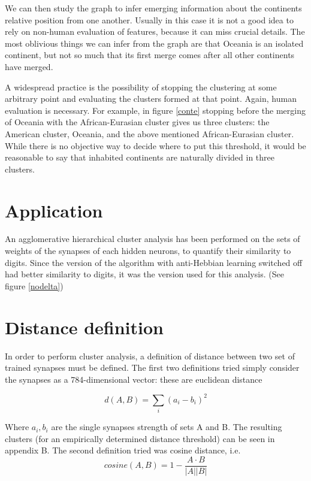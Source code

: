 \documentclass[a4paper]{report}
\begin{document}
We can then study the graph to infer emerging information about the continents relative position from one another.
Usually in this case it is not a good idea to rely on non-human evaluation of features, because it can miss crucial details.
The most oblivious things we can infer from the graph are that Oceania is an isolated continent, but not so much that its first merge comes after all other continents have merged.

A widespread practice is the possibility of stopping the clustering at some arbitrary point and evaluating the clusters formed at that point.
Again, human evaluation is necessary.
For example, in figure \ref{conte} stopping before the merging of Oceania with the African-Eurasian cluster gives us three clusters:
the American cluster, Oceania, and the above mentioned African-Eurasian cluster.
While there is no objective way to decide where to put this threshold, it would be reasonable to say that inhabited continents are naturally divided in three clusters.

\section{Application}

An agglomerative hierarchical cluster analysis has been performed on the sets of weights of the synapses of each hidden neurons, to quantify their similarity to digits.
Since the version of the algorithm with anti-Hebbian learning switched off had better similarity to digits, it was the version used for this analysis.
(See figure \ref{nodelta})

\section{Distance definition}

In order to perform cluster analysis, a definition of distance between two set of trained synapses must be defined.
The first two definitions tried simply consider the synapses as a 784-dimensional vector:
these are euclidean distance

\begin{equation}
    d(A,B) = \sum_i (a_i-b_i)^2
\end{equation}

Where $a_i, b_i$ are the single synapses strength of sets A and B.
The resulting clusters (for an empirically determined distance threshold) can be seen in appendix B.
The second definition tried was cosine distance, i.e.
\begin{equation}
    cosine(A,B) = 1 - \frac{A \cdot B}{|A||B|}
\end{equation}
\end{document}
